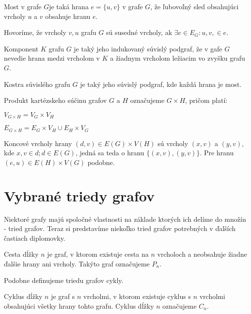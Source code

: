 \begin{defin}
Most v grafe $G$je taká hrana $e = \{ u,v \}$ v grafe $G$, že ľubovoľný sled 
obsahujúci vrcholy $u$ a $v$ obsahuje hranu $e$.
\end{defin}

\begin{defin}
Hovoríme, že vrcholy $v, u$ grafu $G$ sú susedné vrcholy, ak $\exists e \in
E_{G}: u,v, \in e$.
\end{defin}

\begin{defin}
Komponent $K$ grafu $G$ je taký jeho indukovaný súvislý podgraf, že v gafe 
$G$ nevedie hrana medzi vrcholom v $K$ a žiadnym vrcholom ležiacim vo 
zvyšku grafu $G$.
\end{defin}

\begin{defin}
Kostra súvislého grafu $G$ je taký jeho súvislý podgraf, kde každá hrana je
most.
\end{defin}

\begin{defin}
Produkt kartézskeho súčinu grafov $G$ a $H$ označujeme $G \times H$, pričom
platí:

$V_{G \times H} = V_{G} \times V_{H}$

$E_{G \times H} = E_{G} \times V_{H} \cup E_{H} \times V_{G} $

Koncové vrcholy hrany $(d,v) \in E(G) \times V(H)$ sú vrcholy $(x,v)$ a
$(y,v)$, kde $x,v \in d; d \in E(G)$, jedná sa teda o hranu $\{(x,v), (y,v)\}$.
Pre hranu $(e,u) \in E(H) \times V(G)$
podobne.
\end{defin}


\section{Vybrané triedy grafov}
Niektoré grafy majú spoločné vlastnosti na základe ktorých ich delíme do
množín - tried grafov.
Teraz si predstavíme niekoľko tried grafov potrebných v ďalších častiach
diplomovky. 

\begin{defin}
Cesta dĺžky $n$ je graf, v ktorom existuje cesta na $n$ vrcholoch a neobsahuje
žiadne ďalšie hrany ani vrcholy. Takýto graf označujeme $P_{n}$.
\end{defin}

Podobne definujeme triedu grafov cykly.

\begin{defin}
Cyklus dĺžky $n$ je graf s $n$ vrcholmi, v ktorom existuje cyklus s $n$
vrcholmi obsahujúci všetky hrany tohto grafu. Cyklus dĺžky $n$ označujeme
$C_{n}$.
\end{defin}

